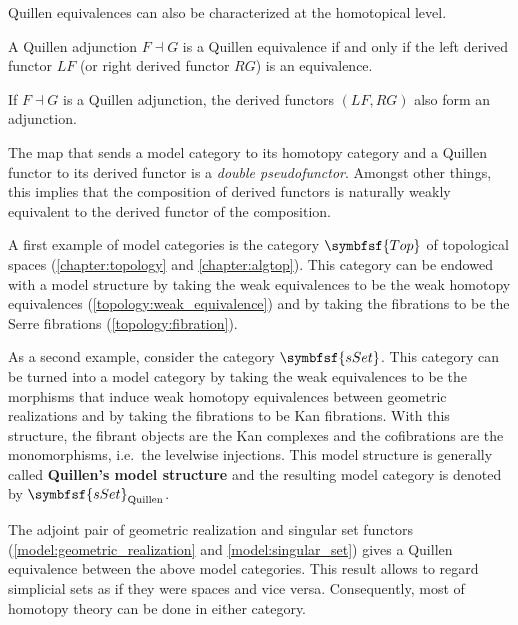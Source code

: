     Quillen equivalences can also be characterized at the homotopical level.
    \begin{property}
        A Quillen adjunction $F\dashv G$ is a Quillen equivalence if and only if the left derived functor $LF$ (or right derived functor $RG$) is an equivalence.
    \end{property}
    \begin{property}
        If $F\dashv G$ is a Quillen adjunction, the derived functors $(LF,RG)$ also form an adjunction.
    \end{property}

    \begin{property}
        The map that sends a model category to its homotopy category and a Quillen functor to its derived functor is a \textit{double pseudofunctor}. Amongst other things, this implies that the composition of derived functors is naturally weakly equivalent to the derived functor of the composition.
    \end{property}

    \begin{example}
        A first example of model categories is the category $\symbfsf{Top}$ of topological spaces (\cref{chapter:topology} and \cref{chapter:algtop}). This category can be endowed with a model structure by taking the weak equivalences to be the weak homotopy equivalences (\cref{topology:weak_equivalence}) and by taking the fibrations to be the Serre fibrations (\cref{topology:fibration}).
    \end{example}
    \begin{example}\label{model:sset_model_structure}
        As a second example, consider the category $\symbfsf{sSet}$. This category can be turned into a model category by taking the weak equivalences to be the morphisms that induce weak homotopy equivalences between geometric realizations and by taking the fibrations to be Kan fibrations. With this structure, the fibrant objects are the Kan complexes and the cofibrations are the monomorphisms, i.e.~the levelwise injections. This model structure is generally called \textbf{Quillen's model structure} and the resulting model category is denoted by $\symbfsf{sSet}_{\text{Quillen}}$.
    \end{example}

    \begin{property}[Quillen]\label{cat:quillen_sset_top}
        The adjoint pair of geometric realization and singular set functors (\cref{model:geometric_realization} and \cref{model:singular_set}) gives a Quillen equivalence between the above model categories. This result allows to regard simplicial sets as if they were spaces and vice versa. Consequently, most of homotopy theory can be done in either category.
    \end{property}

